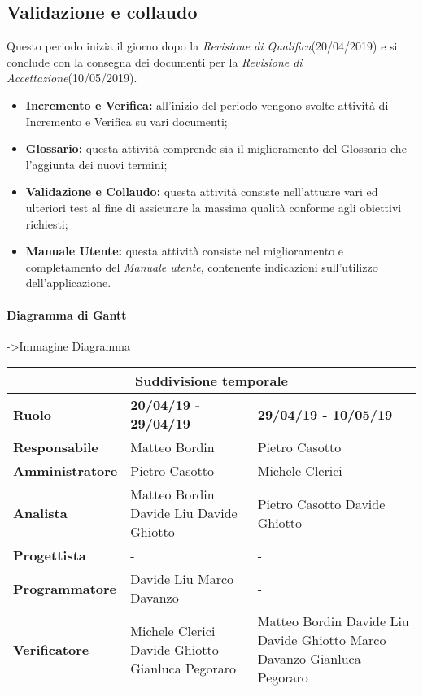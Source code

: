 \subsection{Validazione e collaudo}
Questo periodo inizia il giorno dopo la  \textit{Revisione di Qualifica}(20/04/2019) e si conclude con la consegna dei documenti per la  \textit{Revisione di Accettazione}(10/05/2019). 
\begin{itemize}
	\item{\textbf{Incremento e Verifica:} all’inizio del periodo vengono svolte attività di Incremento e Verifica su vari documenti;}
	\item{\textbf{Glossario:} questa attività comprende sia il miglioramento del Glossario che l’aggiunta dei nuovi termini;}
	\item{\textbf{Validazione e Collaudo:} questa attività consiste nell'attuare vari ed ulteriori test al fine di assicurare la massima qualità conforme agli obiettivi richiesti;}
	\item{\textbf{Manuale Utente:} questa attività consiste nel miglioramento e completamento del \textit{Manuale utente}, contenente indicazioni sull’utilizzo dell’applicazione.}
\end{itemize}

\paragraph{Diagramma di Gantt}
->Immagine Diagramma

\begin{tabular}{|l|l|l|}
	\hline
	\multicolumn{3}{|c|}{\textbf{Suddivisione temporale}}\\
	\hline
	\textbf{Ruolo} & \textbf{20/04/19 - 29/04/19} & \textbf{29/04/19 - 10/05/19} \\
	\hline
	\textbf{Responsabile} & Matteo Bordin  & Pietro Casotto   \\
	\hline
	\textbf{Amministratore} & Pietro Casotto & Michele Clerici \\
	\hline
	\textbf{Analista} & Matteo Bordin Davide Liu Davide Ghiotto & Pietro Casotto Davide Ghiotto \\
	\hline
	\textbf{Progettista} & - & - \\
	\hline
	\textbf{Programmatore} & Davide Liu Marco Davanzo & - \\
	\hline
	\textbf{Verificatore} & Michele Clerici Davide Ghiotto Gianluca Pegoraro & Matteo Bordin Davide Liu Davide Ghiotto Marco Davanzo Gianluca Pegoraro \\
	\hline
\end{tabular}


